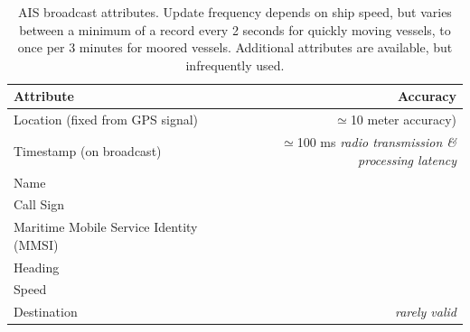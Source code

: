 \begin{table}[htbp]
  \begin{tabular}{lr}
    Attribute & Accuracy \\
    \hline
    Location (fixed from GPS signal) & $\simeq$10 meter accuracy) \\
    Timestamp (on broadcast) & $\simeq$100 ms \textit{radio transmission \& processing latency}\\
    Name \\
    Call Sign \\
    Maritime Mobile Service Identity (MMSI) \\
    Heading \\
    Speed \\
    Destination & \textit{rarely valid}
  \end{tabular}
  \caption{AIS broadcast attributes. Update frequency depends on ship speed, but varies between a minimum of a record every 2 seconds for quickly moving vessels, to once per 3 minutes for moored vessels. Additional attributes are available, but infrequently used.}
  \label{table:ais-broadcast-attributes}
\end{table}


